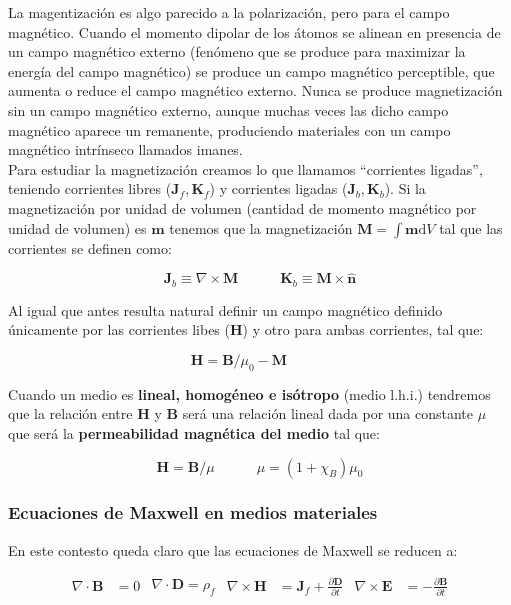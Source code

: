 \documentclass[12pt,a4paper]{article}
\newcommand{\parciales}[2]{\frac{\partial #1}{\partial #2}}
\newcommand{\D}{\mathrm{d}}
\newcommand{\tquad}{\quad \quad \quad}
\newcommand{\rota}{\nabla \times}
\newcommand{\dive}{\nabla \cdot}
\newcommand{\Bn}{\mathbf{B}}
\newcommand{\En}{\mathbf{E}}
\newcommand{\Dn}{\mathbf{D}}
\newcommand{\Hn}{\mathbf{H}}
\newcommand{\Jn}{\mathbf{J}}
\newcommand{\Kn}{\mathbf{K}}
\newcommand{\mn}{\mathbf{m}}
\newcommand{\Mn}{\mathbf{M}}
\newcommand{\hnn}{\hat{\mathbf{n}}}
\numberwithin{equation}{section}
\numberwithin{figure}{section}
\begin{document}
La magentización es algo parecido a la polarización, pero para el campo magnético. Cuando el momento dipolar de los átomos se alinean en presencia de un campo magnético externo (fenómeno que se produce para maximizar la energía del campo magnético) se produce un campo magnético perceptible, que aumenta o reduce el campo magnético externo. Nunca se produce magnetización sin un campo magnético externo, aunque muchas veces las dicho campo magnético aparece un remanente, produciendo materiales con un campo magnético intrínseco llamados imanes. \\

Para estudiar la magnetización creamos lo que llamamos ``corrientes ligadas'', teniendo corrientes libres ($\Jn_f, \Kn_f$) y corrientes ligadas ($\Jn_b,\Kn_b$). Si la magnetización por unidad de volumen  (cantidad de momento magnético por unidad de volumen) es $\mn$ tenemos que la magnetización $\Mn = \int \mn \D V$ tal que las corrientes se definen como:

\begin{equation}
\Jn_b \equiv \rota \Mn \tquad \Kn_b \equiv \Mn \times \hnn
\end{equation}

Al igual que antes resulta natural definir un campo magnético definido únicamente por las corrientes libes ($\Hn$) y otro para ambas corrientes, tal que:

\begin{equation}
\Hn = \Bn/\mu_0 - \Mn \tquad
\end{equation}

Cuando un medio es \textbf{lineal, homogéneo e isótropo} (medio l.h.i.) tendremos que la relación entre $\Hn$ y $\Bn$ será una relación lineal dada por una constante $\mu$ que será la \textbf{permeabilidad magnética del medio} tal que:

\begin{equation}
\Hn = \Bn / \mu \tquad \mu = (1+\chi_B) \mu_0
\end{equation}


\subsubsection{Ecuaciones de Maxwell en medios materiales}

En este contesto queda claro que las ecuaciones de Maxwell se reducen a:



\begin{subequations}\label{Ec:5.1.Maxwell}
\begin{align}
\dive \Bn & = 0 \label{Ec:5.1.a.DivB}
\end{align}
\begin{align}
\dive \Dn = \rho_f \label{Ec:5.1.b.DivD}
\end{align}
\begin{align}
\rota \Hn  & =  \Jn_f + \parciales{\Dn}{t} \label{Ec:5.1.c.RotH}
\end{align}
\begin{align}
\rota \En  & = -  \parciales{\Bn}{t} \label{Ec:5.1.d.RotE}
\end{align}
\end{subequations}
\end{document}
